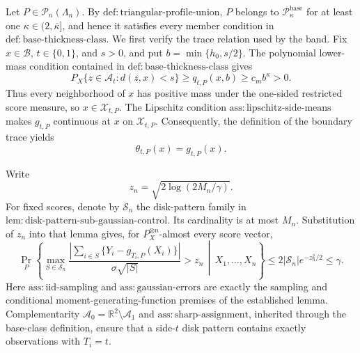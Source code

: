 Let \(P\in\mathcal P_n(\Lambda_n)\).  By \(\mathrm{def:triangular\text{-}profile\text{-}union}\), \(P\) belongs to \(\mathcal P_{\kappa}^{\mathrm{base}}\) for at least one \(\kappa\in(2,\overline\kappa]\), and hence it satisfies every member condition in \(\mathrm{def:base\text{-}thickness\text{-}class}\).  We first verify the trace relation used by the band.  Fix \(x\in\mathcal B\), \(t\in\{0,1\}\), and \(s>0\), and put \(b=\min\{h_0,s/2\}\).  The polynomial lower-mass condition contained in \(\mathrm{def:base\text{-}thickness\text{-}class}\) gives
\[
 P_X\{z\in\mathcal A_t:d(z,x)<s\}
 \ge q_{t,P}(x,b)\ge c_m b^\kappa>0. \tag{1}
\]
Thus every neighborhood of \(x\) has positive mass under the one-sided restricted score measure, so \(x\in\mathcal X_{t,P}\).  The Lipschitz condition \(\mathrm{ass:lipschitz\text{-}side\text{-}means}\) makes \(g_{t,P}\) continuous at \(x\) on \(\mathcal X_{t,P}\).  Consequently, the definition of the boundary trace yields
\[
 \theta_{t,P}(x)=g_{t,P}(x). \tag{2}
\]

Write
\[
 z_n=\sqrt{2\log(2M_n/\gamma)}.
\]
For fixed scores, denote by \(\mathcal S_n\) the disk-pattern family in \(\mathrm{lem:disk\text{-}pattern\text{-}sub\text{-}gaussian\text{-}control}\).  Its cardinality is at most \(M_n\).  Substitution of \(z_n\) into that lemma gives, for \(P_X^{\otimes n}\)-almost every score vector,
\[
 \Pr_P\!\left\{\max_{S\in\mathcal S_n}
 \frac{\left|\sum_{i\in S}\{Y_i-g_{T_i,P}(X_i)\}\right|}
 {\sigma\sqrt{|S|}}>z_n
 \,\middle|\,X_1,\ldots,X_n\right\}
 \le 2|\mathcal S_n|e^{-z_n^2/2}\le\gamma. \tag{3}
\]
Here \(\mathrm{ass:iid\text{-}sampling}\) and \(\mathrm{ass:gaussian\text{-}errors}\) are exactly the sampling and conditional moment-generating-function premises of the established lemma.  Complementarity \(\mathcal A_0=\mathbb R^2\setminus\mathcal A_1\) and \(\mathrm{ass:sharp\text{-}assignment}\), inherited through the base-class definition, ensure that a side-\(t\) disk pattern contains exactly observations with \(T_i=t\).

